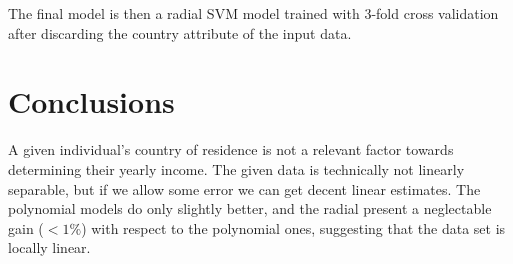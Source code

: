 \documentclass[english]{scrartcl}
\begin{document}
The final model is then a radial SVM model trained with 3-fold cross validation after discarding the country attribute of the input data.

\section{Conclusions}

A given individual's country of residence is not a relevant factor towards determining their yearly income. The given data is technically not linearly separable, but if we allow some error we can get decent linear estimates. The polynomial models do only slightly better, and the radial present a neglectable gain ($<1\%$) with respect to the polynomial ones, suggesting that the data set is locally linear.
\end{document}

